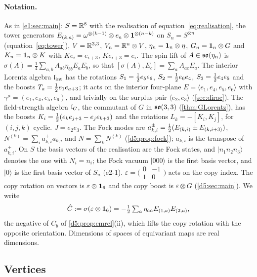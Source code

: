 \paragraph{Notation.} As in \cref{e1:sec:main}: $S=\mathbb{R}^8$ with the realisation of equation~\cref{eq:realisation}, the tower generators
$E_{(k,a)}=\omega^{\otimes(k-1)}\otimes e_a\otimes\mathbf 1^{\otimes(n-k)}$ on $S_n=S^{\otimes n}$ (equation~\cref{eq:tower}), $V=\mathbb{R}^{3,3}$,
$V_n=\mathbb{R}^n\otimes V$, $\eta_n=\mathbf 1_n\otimes\eta$, $G_n=\mathbf 1_n\otimes G$ and $K_n=\mathbf 1_n\otimes K$ with $Ke_i=e_{i+3}$, $Ke_{i+3}=e_i$. The spin lift of
$A\in\mathfrak{so}(\eta_n)$ is $\sigma(A)=\tfrac14\sum_{a,b}A_{ab}\eta_{bb}E_aE_b$, so that $[\sigma(A),E_c]=\sum_aA_{ac}E_a$. The interior Lorentz algebra
$\mathfrak l_{\rm int}$ has the rotations $S_1=\tfrac12 e_5e_6$, $S_2=\tfrac12 e_6e_4$, $S_3=\tfrac12 e_4e_5$ and the boosts $T_a=\tfrac12 e_1e_{a+3}$; it acts on the
interior four-plane $E=\langle e_1,e_4,e_5,e_6\rangle$ with $\gamma^\mu=(e_1,e_4,e_5,e_6)$, and trivially on the surplus pair $\langle e_2,e_3\rangle$
(\cref{sec:dirac}). The field-strength algebra $\mathfrak l_G$, the commutant of $G$ in $\mathfrak{so}(3,3)$ (\cref{thm:GLorentz}), has the boosts
$K_i=\tfrac12(e_ke_{j+3}-e_je_{k+3})$ and the rotations $L_k=-[K_i,K_j]$, for $(i,j,k)$ cyclic. $J=e_2e_3$. The Fock modes are
$a^\pm_{k,i}=\tfrac12(E_{(k,i)}\pm E_{(k,i+3)})$, $N^{(k)}=\sum_ia^+_{k,i}a^-_{k,i}$ and $N=\sum_kN^{(k)}$ (\cref{d5:prop:fock}); $a^-_{k,i}$ is the
transpose of $a^+_{k,i}$. On $S$ the basis vectors of the realisation are the Fock states, and $|n_1n_2n_3\rangle$ denotes the one with
$N_i=n_i$; the Fock vacuum $|000\rangle$ is the first basis vector, and $|0\rangle$ is the first basis vector of $S_n$ (e2-1). $\varepsilon=\bigl(\begin{smallmatrix}0&-1\\1&0\end{smallmatrix}\bigr)$
acts on the copy index. The copy rotation on vectors is $\varepsilon\otimes\mathbf 1_6$ and the copy boost is $\varepsilon\otimes G$ (\cref{d5:sec:main}). We write
\[
\hat C:=\sigma(\varepsilon\otimes\mathbf 1_6)=-\tfrac12\textstyle\sum_a\eta_{aa}E_{(1,a)}E_{(2,a)} ,
\]
the negative of $C_b$ of \cref{d5:prop:cmrel}(ii), which lifts the copy rotation with the opposite orientation. Dimensions of
spaces of equivariant maps are real dimensions.

\subsection{Vertices}
\label{e2:sec:vertex}

